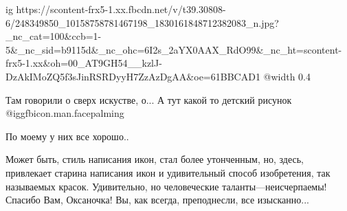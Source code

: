 
 
 
 
 

\ifcmt
  ig https://scontent-frx5-1.xx.fbcdn.net/v/t39.30808-6/248349850_10158758781467198_1830161848712382083_n.jpg?_nc_cat=100&ccb=1-5&_nc_sid=b9115d&_nc_ohc=6I2s_2aYX0AAX_RdO99&_nc_ht=scontent-frx5-1.xx&oh=00_AT9GH54__kzlJ-DzAkIMoZQ5f3sJinRSRDyyH7ZzAzDgAA&oe=61BBCAD1
  @width 0.4
\fi


Там говорили о сверх искустве, о... А тут какой то детский рисунок @igg{fbicon.man.facepalming} 



По моему у них все хорошо..


Может быть, стиль написания икон, стал более утонченным, но, здесь, привлекает
старина написания икон и удивительный способ изобретения, так называемых
красок. Удивительно, но человеческие таланты—неисчерпаемы! Спасибо Вам,
Оксаночка! Вы, как всегда, преподнесли, все изысканно...

